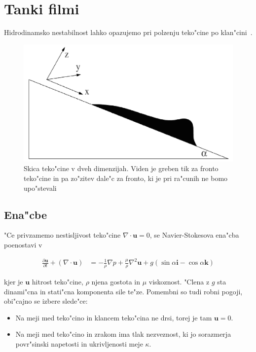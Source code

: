 \documentclass[a4paper,10pt]{article}
\renewcommand{\vec}{\mathbf}
\begin{document}
\section{Tanki filmi}

Hidrodinamsko nestabilnost lahko opazujemo pri polzenju teko"cine po klan"cini~\cite{kondic}. 

\begin{figure}[h]
\centering
 \includegraphics[width=.8\textwidth]{./Slike/film-skica}
\caption{Skica teko"cine v dveh dimenzijah. Viden je greben tik za fronto teko"cine in pa zo"zitev dale"c za fronto, ki je pri ra"cunih ne bomo upo"stevali}
\label{fig:film-skica}
\end{figure}


\subsection{Ena"cbe}

"Ce privzamemo nestisljivost teko"cine $\nabla \cdot \vec u = 0$, se Navier-Stokesova ena"cba poenostavi v 

\begin{align}
 \label{eq:ns-film}
 \frac{\partial \vec u}{\partial t} + (\nabla \cdot \vec u) &= -\frac{1}{\rho}\nabla p + \frac{\mu}{\rho}\nabla^2 \vec u + g (\sin \alpha \vec i - \cos \alpha \vec k)
\end{align}

kjer je $\vec u$ hitrost teko"cine, $\rho$ njena gostota in $\mu$ viskoznost. "Clena z $g$ sta dinami"cna in stati"cna komponenta sile te"ze. Pomembni so tudi robni pogoji, obi"cajno se izbere slede"ce:

\begin{itemize}
 \item Na meji med teko"cino in klancem teko"cina ne drsi, torej je tam $\vec u = 0$. 
 \item Na meji med teko"cino in zrakom ima tlak nezveznost, ki jo sorazmerja povr"sinski napetosti in ukrivljenosti meje $\kappa$. 
\end{itemize}
\end{document}
